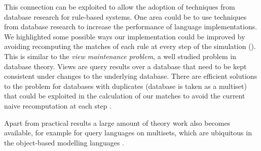 This connection can be exploited to allow the adoption of techniques from
database research for rule-based systems. One area could be to use techniques
from database research to increase the performance of language
implementations. We highlighted some possible ways our implementation could be
improved by avoiding recomputing the matches of each rule at every step of the
simulation (). This is similar to the \emph{view maintenance
  problem}, a well studied problem in database theory. Views are query results
over a database that need to be kept consistent under changes to the underlying
database. There are efficient solutions to the problem for databases with
duplicates (database is taken as a multiset) that could be exploited in the
calculation of our matches to avoid the current naive recomputation at each step
\citep{griffin_incremental_1995}.

Apart from practical results a large amount of theory work also becomes
available, for example for query languages on multisets, which are ubiquitous in
the object-based modelling languages \citep{libkin_query_1997,
  buneman_comprehension_1994}.









